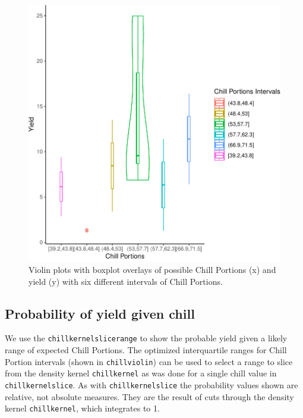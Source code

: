 \documentclass[]{article}
\begin{document}
\begin{figure}
\centering
\includegraphics{Chill_Yield_Qta_data_files/figure-latex/unnamed-chunk-5-1.pdf}
\caption{Violin plots with boxplot overlays of possible Chill Portions
(x) and yield (y) with six different intervals of Chill Portions.}
\end{figure}

\hypertarget{probability-of-yield-given-chill}{%
\subsection{Probability of yield given
chill}\label{probability-of-yield-given-chill}}

We use the \texttt{chillkernelslicerange} to show the probable yield
given a likely range of expected Chill Portions. The optimized
interquartile ranges for Chill Portion intervals (shown in
\texttt{chillviolin}) can be used to select a range to slice from the
density kernel \texttt{chillkernel} as was done for a single chill value
in \texttt{chillkernelslice}. As with \texttt{chillkernelslice} the
probability values shown are relative, not absolute measures. They are
the result of cuts through the density kernel \texttt{chillkernel},
which integrates to 1.
\end{document}
